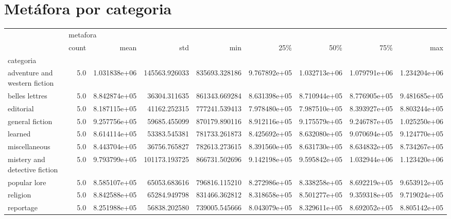 \documentclass[11pt]{article}
\begin{document}
\section{Metáfora por categoria}
\begin{tabular}{lrrrrrrrr}
\toprule
{} & \multicolumn{8}{l}{metafora} \\
{} &    count &          mean &            std &            min &           25\% &           50\% &           75\% &           max \\
categoria                     &          &               &                &                &               &               &               &               \\
\midrule
adventure and western fiction &      5.0 &  1.031838e+06 &  145563.926033 &  835693.328186 &  9.767892e+05 &  1.032713e+06 &  1.079791e+06 &  1.234204e+06 \\
belles lettres                &      5.0 &  8.842874e+05 &   36304.311635 &  861343.669284 &  8.631398e+05 &  8.710944e+05 &  8.776905e+05 &  9.481685e+05 \\
editorial                     &      5.0 &  8.187115e+05 &   41162.252315 &  777241.539413 &  7.978480e+05 &  7.987510e+05 &  8.393927e+05 &  8.803244e+05 \\
general fiction               &      5.0 &  9.257756e+05 &   59685.455099 &  870179.890116 &  8.912116e+05 &  9.175579e+05 &  9.246787e+05 &  1.025250e+06 \\
learned                       &      5.0 &  8.614114e+05 &   53383.545381 &  781733.261873 &  8.425692e+05 &  8.632080e+05 &  9.070694e+05 &  9.124770e+05 \\
miscellaneous                 &      5.0 &  8.443704e+05 &   36756.765827 &  782613.273615 &  8.391560e+05 &  8.631730e+05 &  8.634832e+05 &  8.734267e+05 \\
mistery and detective fiction &      5.0 &  9.793799e+05 &  101173.193725 &  866731.502696 &  9.142198e+05 &  9.595842e+05 &  1.032944e+06 &  1.123420e+06 \\
popular lore                  &      5.0 &  8.585107e+05 &   65053.683616 &  796816.115210 &  8.272986e+05 &  8.338258e+05 &  8.692219e+05 &  9.653912e+05 \\
religion                      &      5.0 &  8.842588e+05 &   65284.949798 &  831466.362812 &  8.318658e+05 &  8.501277e+05 &  9.359318e+05 &  9.719024e+05 \\
reportage                     &      5.0 &  8.251988e+05 &   56838.202580 &  739005.545666 &  8.043079e+05 &  8.329611e+05 &  8.692052e+05 &  8.805142e+05 \\

\end{tabular}
\end{document}
